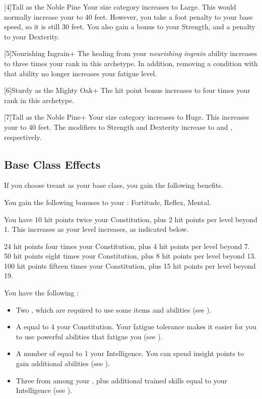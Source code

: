 [4]{Tall as the Noble Pine} Your size category increases to Large.
This would normally increase your  to 40 feet.
However, you take a  foot penalty to your base speed, so it is still 30 feet.
You also gain a  bonus to your Strength, and a  penalty to your Dexterity.

[5]{Nourishing Ingrain+} The healing from your \textit{nourishing ingrain} ability increases to three times your rank in this archetype.
In addition, removing a condition with that ability no longer increases your fatigue level.

[6]{Sturdy as the Mighty Oak+} The hit point bonus increases to four times your rank in this archetype.

[7]{Tall as the Noble Pine+} Your size category increases to Huge.
This increases your  to 40 feet.
The modifiers to Strength and Dexterity increase to  and , respectively.

\subsection{Base Class Effects}
If you choose treant as your base class, you gain the following benefits.

You gain the following bonuses to your :  Fortitude,  Reflex,  Mental.

You have 10 hit points \add twice your Constitution, plus 2 hit points per level beyond 1.
This increases as your level increases, as indicated below.
\begin{itemize}
	 24 hit points \add four times your Constitution, plus 4 hit points per level beyond 7.
	 50 hit points \add eight times your Constitution, plus 8 hit points per level beyond 13.
	 100 hit points \add fifteen times your Constitution, plus 15 hit points per level beyond 19.
\end{itemize}

 You have the following :
\begin{itemize}
	\item Two , which are required to use some items and abilities (see ).
	\item A  equal to 4 \add your Constitution.
	      Your fatigue tolerance makes it easier for you to use powerful abilities that fatigue you (see ).
	\item A number of  equal to 1 \add your Intelligence.
	      You can spend insight points to gain additional abilities (see ).
	\item Three  from among your , plus additional trained skills equal to your Intelligence (see ).
\end{itemize}


